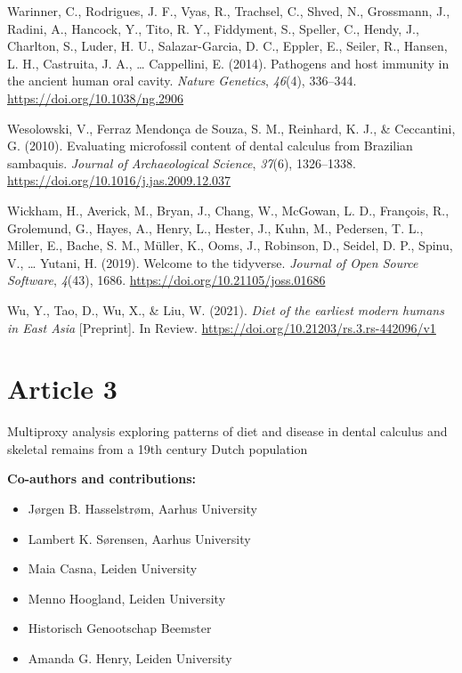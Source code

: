 \documentclass[
  b5paper,
]{book}
\providecommand{\tightlist}{%
  \setlength{\itemsep}{0pt}\setlength{\parskip}{0pt}}
\newlength{\cslhangindent}
\newenvironment{CSLReferences}[2] %
 {\begin{list}{}{%
  \setlength{\itemindent}{0pt}
  \setlength{\leftmargin}{0pt}
  \setlength{\parsep}{0pt}
  \ifodd #1
   \setlength{\leftmargin}{\cslhangindent}
   \setlength{\itemindent}{-1\cslhangindent}
  \fi
  \setlength{\itemsep}{#2\baselineskip}}}
 {\end{list}}
\begin{document}
\begin{CSLReferences}{1}{0}
Warinner, C., Rodrigues, J. F., Vyas, R., Trachsel, C., Shved, N.,
Grossmann, J., Radini, A., Hancock, Y., Tito, R. Y., Fiddyment, S.,
Speller, C., Hendy, J., Charlton, S., Luder, H. U., Salazar-Garcia, D.
C., Eppler, E., Seiler, R., Hansen, L. H., Castruita, J. A., \ldots{}
Cappellini, E. (2014). Pathogens and host immunity in the ancient human
oral cavity. \emph{Nature Genetics}, \emph{46}(4), 336--344.
\url{https://doi.org/10.1038/ng.2906}

Wesolowski, V., Ferraz Mendonça de Souza, S. M., Reinhard, K. J., \&
Ceccantini, G. (2010). Evaluating microfossil content of dental calculus
from {Brazilian} sambaquis. \emph{Journal of Archaeological Science},
\emph{37}(6), 1326--1338.
\url{https://doi.org/10.1016/j.jas.2009.12.037}

Wickham, H., Averick, M., Bryan, J., Chang, W., McGowan, L. D.,
François, R., Grolemund, G., Hayes, A., Henry, L., Hester, J., Kuhn, M.,
Pedersen, T. L., Miller, E., Bache, S. M., Müller, K., Ooms, J.,
Robinson, D., Seidel, D. P., Spinu, V., \ldots{} Yutani, H. (2019).
Welcome to the {tidyverse}. \emph{Journal of Open Source Software},
\emph{4}(43), 1686. \url{https://doi.org/10.21105/joss.01686}

Wu, Y., Tao, D., Wu, X., \& Liu, W. (2021). \emph{Diet of the earliest
modern humans in {East Asia}} {[}Preprint{]}. {In Review}.
\url{https://doi.org/10.21203/rs.3.rs-442096/v1}

\end{CSLReferences}


\chapter{Article 3}\label{article-3}

Multiproxy analysis exploring patterns of diet and disease in dental
calculus and skeletal remains from a 19th century Dutch population

\hfill\break

\footnotesize

\textbf{Co-authors and contributions:}

\begin{itemize}
\tightlist
\item
  Jørgen B. Hasselstrøm, Aarhus University
\item
  Lambert K. Sørensen, Aarhus University
\item
  Maia Casna, Leiden University
\item
  Menno Hoogland, Leiden University
\item
  Historisch Genootschap Beemster
\item
  Amanda G. Henry, Leiden University
\end{itemize}
\end{document}
